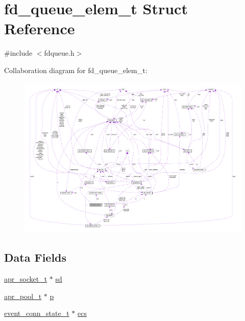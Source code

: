 \hypertarget{structfd__queue__elem__t}{}\section{fd\+\_\+queue\+\_\+elem\+\_\+t Struct Reference}
\label{structfd__queue__elem__t}


{\ttfamily \#include $<$fdqueue.\+h$>$}



Collaboration diagram for fd\+\_\+queue\+\_\+elem\+\_\+t\+:
\nopagebreak
\begin{figure}[H]
\begin{center}
\leavevmode
\includegraphics[width=350pt]{structfd__queue__elem__t__coll__graph}
\end{center}
\end{figure}
\subsection*{Data Fields}
\begin{DoxyCompactItemize}
\item 
\hyperlink{structapr__socket__t}{apr\+\_\+socket\+\_\+t} $\ast$ \hyperlink{structfd__queue__elem__t_a04934612aa0f85b323659d652bc061a5}{sd}
\item 
\hyperlink{structapr__pool__t}{apr\+\_\+pool\+\_\+t} $\ast$ \hyperlink{structfd__queue__elem__t_a6b6e73a58c344f80a3fab25eb35f9fd3}{p}
\item 
\hyperlink{structevent__conn__state__t}{event\+\_\+conn\+\_\+state\+\_\+t} $\ast$ \hyperlink{structfd__queue__elem__t_a4450cbada67982a9d2202b8330458a99}{ecs}
\end{DoxyCompactItemize}


